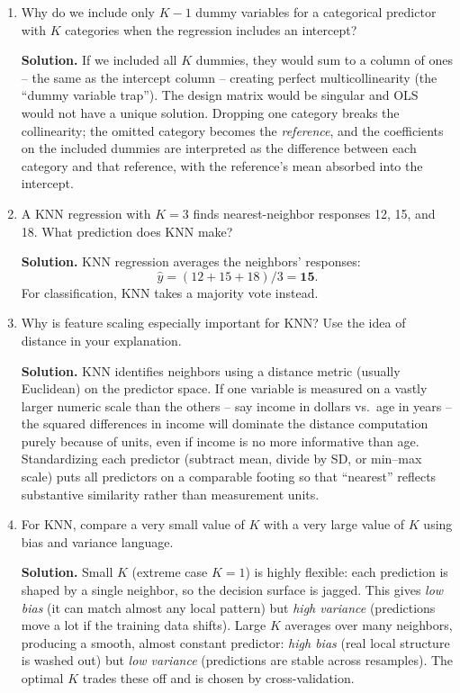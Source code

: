 \documentclass[11pt]{article}
\newcommand{\solution}[1]{%
  \par\medskip\noindent\textbf{Solution.} #1\par\medskip
}
\begin{document}
\begin{enumerate}[leftmargin=*]
\item Why do we include only $K-1$ dummy variables for a categorical predictor with $K$ categories when the regression includes an intercept?

\solution{If we included all $K$ dummies, they would sum to a column of ones -- the same as the intercept column -- creating perfect multicollinearity (the ``dummy variable trap''). The design matrix would be singular and OLS would not have a unique solution. Dropping one category breaks the collinearity; the omitted category becomes the \emph{reference}, and the coefficients on the included dummies are interpreted as the difference between each category and that reference, with the reference's mean absorbed into the intercept.}

\item A KNN regression with $K=3$ finds nearest-neighbor responses 12, 15, and 18. What prediction does KNN make?

\solution{KNN regression averages the neighbors' responses:
$$\hat y = (12 + 15 + 18)/3 = \mathbf{15}.$$
For classification, KNN takes a majority vote instead.}

\item Why is feature scaling especially important for KNN? Use the idea of distance in your explanation.

\solution{KNN identifies neighbors using a distance metric (usually Euclidean) on the predictor space. If one variable is measured on a vastly larger numeric scale than the others -- say income in dollars vs.~age in years -- the squared differences in income will dominate the distance computation purely because of units, even if income is no more informative than age. Standardizing each predictor (subtract mean, divide by SD, or min--max scale) puts all predictors on a comparable footing so that ``nearest'' reflects substantive similarity rather than measurement units.}

\item For KNN, compare a very small value of $K$ with a very large value of $K$ using bias and variance language.

\solution{Small $K$ (extreme case $K=1$) is highly flexible: each prediction is shaped by a single neighbor, so the decision surface is jagged. This gives \emph{low bias} (it can match almost any local pattern) but \emph{high variance} (predictions move a lot if the training data shifts). Large $K$ averages over many neighbors, producing a smooth, almost constant predictor: \emph{high bias} (real local structure is washed out) but \emph{low variance} (predictions are stable across resamples). The optimal $K$ trades these off and is chosen by cross-validation.}

\end{enumerate}
\end{document}
